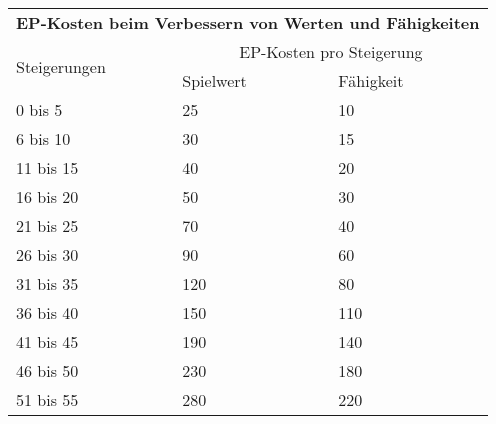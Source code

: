 \documentclass[a4paper, fontsize=11pt]{scrartcl}
\begin{document}
\begin{table}[!ht]
    \centering
    \begin{tabularx}{\textwidth}{l|l|l}
        \multicolumn{3}{c}{\cellcolor{gray!25} \textbf{EP-Kosten beim Verbessern von Werten und Fähigkeiten}                 } \\ \cline{1-3}
        \multirow{2}{*}{Steigerungen} & \multicolumn{2}{c}{EP-Kosten pro Steigerung}                                           \\ \cline{2-3}
                                      & Spielwert                                    & Fähigkeit                               \\ \cline{1-3}
        0 bis 5                       & 25                                           & 10                                      \\ \cline{1-3}
        6 bis 10                      & 30                                           & 15                                      \\ \cline{1-3}
        11 bis 15                     & 40                                           & 20                                      \\ \cline{1-3}
        16 bis 20                     & 50                                           & 30                                      \\ \cline{1-3}
        21 bis 25                     & 70                                           & 40                                      \\ \cline{1-3}
        26 bis 30                     & 90                                           & 60                                      \\ \cline{1-3}
        31 bis 35                     & 120                                          & 80                                      \\ \cline{1-3}
        36 bis 40                     & 150                                          & 110                                     \\ \cline{1-3}
        41 bis 45                     & 190                                          & 140                                     \\ \cline{1-3}
        46 bis 50                     & 230                                          & 180                                     \\ \cline{1-3}
        51 bis 55                     & 280                                          & 220                                     \\ \cline{1-3}

\end{tabularx}
\end{table}
\end{document}

